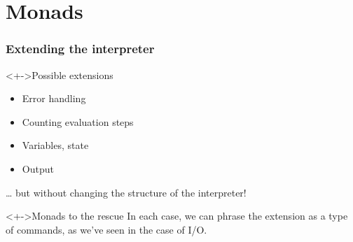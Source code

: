 \documentclass{beamer}
\begin{document}
\section{Monads}
\begin{frame}[fragile]
  \frametitle{Extending the interpreter}
  \begin{block}<+->{Possible extensions}
    \begin{itemize}
    \item Error handling
    \item Counting evaluation steps
    \item Variables, state
    \item Output
    \end{itemize}
    \dots{} but without changing the structure of the interpreter!
  \end{block}
  \begin{block}<+->{Monads to the rescue}
    In each case, we can phrase the extension as a type of commands,
    as we've seen in the case of I/O.
  \end{block}
\end{frame}
\end{document}
